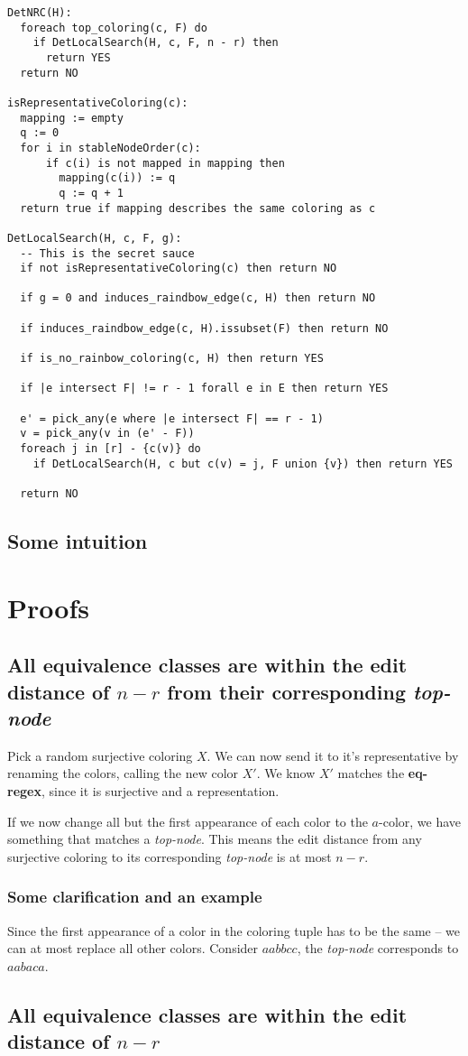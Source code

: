 \documentclass{article}
\begin{document}
\begin{verbatim}
DetNRC(H):
  foreach top_coloring(c, F) do
    if DetLocalSearch(H, c, F, n - r) then
      return YES
  return NO

isRepresentativeColoring(c):
  mapping := empty
  q := 0
  for i in stableNodeOrder(c):
      if c(i) is not mapped in mapping then
        mapping(c(i)) := q
        q := q + 1
  return true if mapping describes the same coloring as c

DetLocalSearch(H, c, F, g):
  -- This is the secret sauce
  if not isRepresentativeColoring(c) then return NO

  if g = 0 and induces_raindbow_edge(c, H) then return NO

  if induces_raindbow_edge(c, H).issubset(F) then return NO

  if is_no_rainbow_coloring(c, H) then return YES

  if |e intersect F| != r - 1 forall e in E then return YES

  e' = pick_any(e where |e intersect F| == r - 1)
  v = pick_any(v in (e' - F))
  foreach j in [r] - {c(v)} do
    if DetLocalSearch(H, c but c(v) = j, F union {v}) then return YES

  return NO
\end{verbatim}

\subsection{Some intuition} 

\pagebreak

\section{Proofs}

\subsection{All equivalence classes are within the edit distance of $n - r$ from their corresponding \textit{top-node}}
Pick a random surjective coloring $X$. We can now send it to it's representative by renaming the colors, calling the new color $X'$.
We know $X'$ matches the \textbf{eq-regex}, since it is surjective and a representation.

If we now change all but the first appearance of each color to the $a$-color, we have something that matches a \textit{top-node}.
This means the edit distance from any surjective coloring to its corresponding \textit{top-node} is at most $n - r$.

\subsubsection{Some clarification and an example}
Since the first appearance of a color in the coloring tuple has to be the same -- we can at most replace all other colors.
Consider $aabbcc$, the \textit{top-node} corresponds to $aabaca$.

\subsection{All equivalence classes are within the edit distance of $n - r$}
\end{document}
